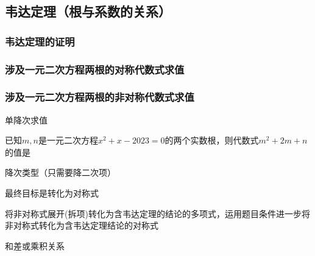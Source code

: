 \subsection{韦达定理（根与系数的关系）}

\subsubsection{韦达定理的证明}


\subsubsection{涉及一元二次方程两根的对称代数式求值}

 

\subsubsection{涉及一元二次方程两根的非对称代数式求值}

单降次求值

已知\(m, n\)是一元二次方程\(x^2+x-2023=0\)的两个实数根，则代数式\(m^2+2m+n\)的值是\underline{\hspace{3.5em}}\

降次类型（只需要降二次项）

最终目标是转化为对称式

将非对称式展开(拆项)转化为含韦达定理的结论的多项式，运用题目条件进一步将非对称式转化为含韦达定理结论的对称式


和差或乘积关系